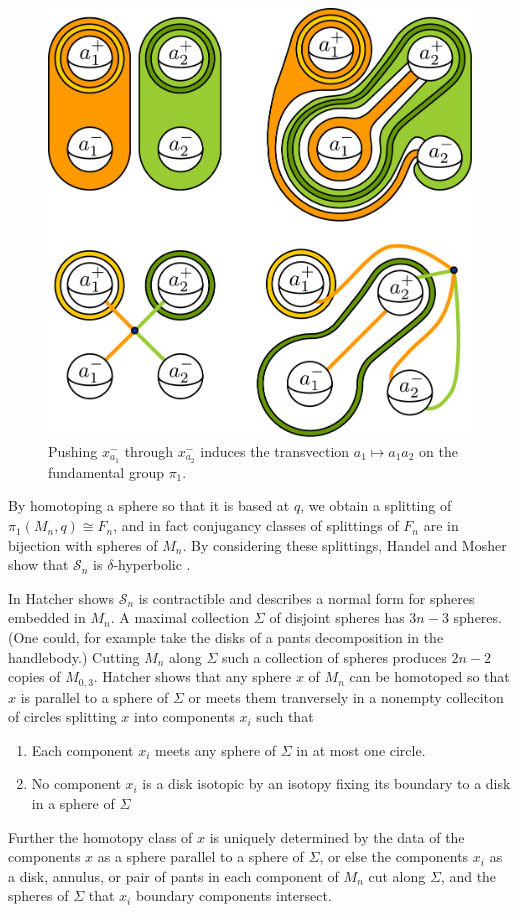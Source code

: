 \begin{figure}[h!]
  \centering
  \includegraphics[width=.6\textwidth]{figures/transvect.pdf}
  \caption{
  Pushing $x^-_{a_1}$ through $x^-_{a_2}$ induces the transvection $a_1 \mapsto a_1a_2$ on the fundamental group $\pi_1$.
  }
  \label{fig:transvect}
\end{figure}


By homotoping a sphere so that it is based at $q$,
we obtain a splitting of $\pi_1(M_n,q) \cong F_n$,
and in fact conjugancy classes of splittings of $F_n$ are in bijection with spheres of $M_n$.
By considering these splittings,
Handel and Mosher show that $\mathcal S_{n}$
is $\delta$-hyperbolic \cite{MR3073931}.



In \cite{MR1314940} Hatcher shows $\mathcal S_n$ is contractible and describes
a normal form for spheres embedded in $M_n$.
A maximal collection $\Sigma$ of disjoint spheres has $3n-3$ spheres. (One could, for example take the disks of a pants decomposition in the handlebody.)
Cutting $M_n$
along $\Sigma$ such a collection of spheres
produces $2n-2$ copies of $M_{0,3}$.
Hatcher shows that any sphere $x$ of $M_{n}$
can be homotoped so that $x$ is parallel to a sphere of
$\Sigma$ or meets them tranversely in a nonempty
colleciton of circles splitting $x$
into components $x_i$ such that
\begin{enumerate}
  \item Each component $x_i$ meets any sphere of $\Sigma$ in at most one circle.
  \item No component $x_i$ is a disk isotopic by an isotopy fixing its boundary to a disk in a sphere of $\Sigma$
\end{enumerate}
Further the homotopy class of $x$ is uniquely determined by the data of the components $x$ as a sphere parallel to a sphere of $\Sigma$, or else the components $x_i$ as a disk, annulus, or pair of pants in each component of $M_n$ cut along $\Sigma$, and the spheres of $\Sigma$ that $x_i$ boundary components intersect.

